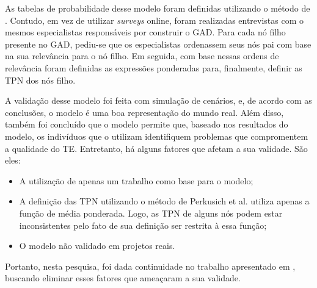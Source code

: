 As tabelas de probabilidade desse modelo foram definidas utilizando o método de \cite{perkusichNPT}. Contudo, em vez de utilizar \textit{surveys} online, foram realizadas entrevistas com o mesmos especialistas responsáveis por construir o GAD. Para cada nó filho presente no GAD, pediu-se que os especialistas ordenassem seus nós pai com base na sua relevância para o nó filho. Em seguida, com base nessas ordens de relevância foram definidas as expressões ponderadas para, finalmente, definir as TPN dos nós filho.

A validação desse modelo foi feita com simulação de cenários, e, de acordo com as conclusões, o modelo é uma boa representação do mundo real. Além disso, também foi concluído que o modelo permite que, baseado nos resultados do modelo, os indivíduos que o utilizam identifiquem problemas que compromentem a qualidade do TE. Entretanto, há alguns fatores que afetam a sua validade. São eles:

\begin{itemize}
  \item A utilização de apenas um trabalho como base para o modelo;
  \item A definição das TPN utilizando o método de Perkusich et al. utiliza apenas a função de média ponderada. Logo, as TPN de alguns nós podem estar inconsistentes pelo fato de sua definição ser restrita à essa função;
  \item O modelo não validado em projetos reais.
\end{itemize}

Portanto, nesta pesquisa, foi dada continuidade no trabalho apresentado em \cite{freire}, buscando eliminar esses fatores que ameaçaram a sua validade.
